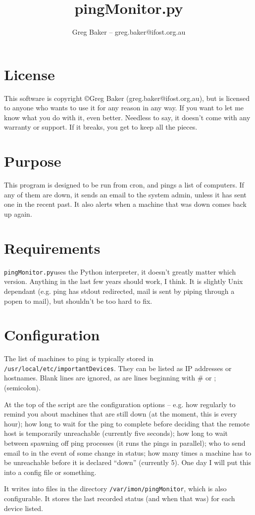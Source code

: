 \documentclass[a4paper,10pt,twocolumn]{article}
\title{pingMonitor.py}
\author{{\small Greg Baker -- greg.baker@ifost.org.au}}
\begin{document}
\maketitle
\tableofcontents
\newcommand{\pingmon}[0]{\texttt{pingMonitor.py}}

\section{License}

This software is copyright \copyright Greg Baker (greg.baker@ifost.org.au),
but is licensed to anyone who wants to use it for any reason
in any way.  If you want to let me know what you do with it,  even better.
Needless to say,  it doesn't come with any warranty or support.  If it
breaks,  you get to keep all the pieces.

\section{Purpose}

This program is designed to be run from cron,  and pings a list of
computers.  If any of them are down,  it sends an email to the system
admin,  unless it has sent one in the recent past.  It also alerts
when a machine that was down comes back up again.

\section{Requirements}

\pingmon uses the Python interpreter,  it doesn't greatly matter which
version.  Anything in the last few years should work, I think.  It is
slightly Unix dependant (e.g.  ping has stdout redirected,  mail is sent
by piping through a popen to mail),  but shouldn't be too hard to fix.

\section{Configuration}

The list of machines to ping is typically stored in 
\texttt{/usr/local/etc/importantDevices}.
They can be listed as IP addresses or hostnames.  
Blank lines are ignored,  as are lines beginning with \# or ; (semicolon).


At the top of the script are the configuration options -- e.g. how
regularly to remind you about machines that are still down (at the
moment, this is every hour); how long to wait for the ping to complete
before deciding that the remote host is temporarily
unreachable (currently five seconds);
how long to wait between spawning off ping processes (it runs the
pings in parallel); who to send email to in the event of some change
in status;  how many times a machine has to be unreachable before it
is declared ``down'' (currently 5).
One day I will put this into a config file or something.

It writes into files in the directory 
\texttt{/var/imon/pingMonitor},  which is also configurable.
It stores the last recorded status (and when that was) for each device listed. 
\end{document}
